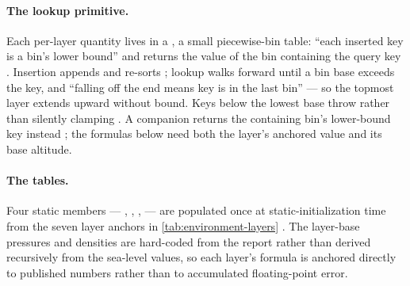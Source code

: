 \paragraph{The lookup primitive.} Each per-layer quantity lives in a , a
small piecewise-bin table: ``each inserted key is a bin's lower bound'' and
 returns the value of the bin containing the query key
. Insertion appends and re-sorts ; lookup walks
forward until a bin base exceeds the key, and ``falling off the end means key is in the last
bin''  --- so the topmost layer extends upward without bound. Keys
below the lowest base throw  rather than silently clamping
. A companion  returns the containing bin's
lower-bound key instead ; the formulas below need both the layer's
anchored value and its base altitude.

\paragraph{The tables.} Four static  members --- ,
, , 
 --- are populated once at static-initialization time
 from the seven layer anchors in
\cref{tab:environment-layers} . The layer-base
pressures and densities are hard-coded from the report rather than derived recursively from
the sea-level values, so each layer's formula is anchored directly to published numbers
rather than to accumulated floating-point error.

